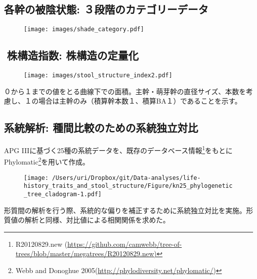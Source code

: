 \documentclass[a0, 30pt, plainboxedsections]{sciposter} %
\begin{document}
\begin{multicols}{3}
{\subsection*{\small{各幹の被陰状態: ３段階のカテゴリーデータ}}

\begin{figure}
	\centering
	\texttt{[image: images/shade\_category.pdf]}
\end{figure}

\columnbreak
\subsection*{\small{株構造指数: 株構造の定量化}}

\begin{wrapfigure}{r}[6]{10em}
   \texttt{[image: images/stool\_structure\_index2.pdf]}
\end{wrapfigure}

０から１までの値をとる曲線下での面積。主幹・萌芽幹の直径サイズ、本数を考慮し、１の場合は主幹のみ（積算幹本数１、積算BA１）であることを示す。

\vspace{1em}
\subsection*{\small{系統解析: 種間比較のための系統独立対比}}

APG IIIに基づく25種の系統データを、既存のデータベース情報\footnote{R20120829.new (\url{https://github.com/camwebb/tree-of-trees/blob/master/megatrees/R20120829.new)}}をもとにPhylomatic\footnote{Webb and Donoghue 2005(\url{http://phylodiversity.net/phylomatic/})}を用いて作成。

\begin{wrapfigure}{r}{16em}
  \texttt{[image: /Users/uri/Dropbox/git/Data-analyses/life-history\_traits\_and\_stool\_structure/Figure/kn25\_phylogenetic\_tree\_cladogram-1.pdf]}
\end{wrapfigure}

形質間の解析を行う際、系統的な偏りを補正するために系統独立対比を実施。形質値の解析と同様、対比値による相関関係を求めた。

}\end{multicols}
\begin{mdframed}[style=section.frame]
  \centering\LARGE\textbf{\color{white}{結果}}
\end{mdframed}
\end{document}
